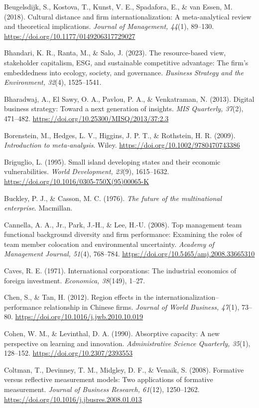 \documentclass[
  a4paper,
  13pt]{extreport}
\begin{document}
Beugelsdijk, S., Kostova, T., Kunst, V. E., Spadafora, E., \& van Essen,
M. (2018). Cultural distance and firm internationalization: A
meta-analytical review and theoretical implications. \emph{Journal of
Management, 44}(1), 89--130.
\url{https://doi.org/10.1177/0149206317729027}

Bhandari, K. R., Ranta, M., \& Salo, J. (2023). The resource-based view,
stakeholder capitalism, ESG, and sustainable competitive advantage: The
firm's embeddedness into ecology, society, and governance.
\emph{Business Strategy and the Environment, 32}(4), 1525--1541.

Bharadwaj, A., El Sawy, O. A., Pavlou, P. A., \& Venkatraman, N. (2013).
Digital business strategy: Toward a next generation of insights.
\emph{MIS Quarterly, 37}(2), 471--482.
\url{https://doi.org/10.25300/MISQ/2013/37:2.3}

Borenstein, M., Hedges, L. V., Higgins, J. P. T., \& Rothstein, H. R.
(2009). \emph{Introduction to meta-analysis}. Wiley.
\url{https://doi.org/10.1002/9780470743386}

Briguglio, L. (1995). Small island developing states and their economic
vulnerabilities. \emph{World Development, 23}(9), 1615--1632.
\url{https://doi.org/10.1016/0305-750X(95)00065-K}

Buckley, P. J., \& Casson, M. C. (1976). \emph{The future of the
multinational enterprise}. Macmillan.

Cannella, A. A., Jr., Park, J.-H., \& Lee, H.-U. (2008). Top management
team functional background diversity and firm performance: Examining the
roles of team member colocation and environmental uncertainty.
\emph{Academy of Management Journal, 51}(4), 768--784.
\url{https://doi.org/10.5465/amj.2008.33665310}

Caves, R. E. (1971). International corporations: The industrial
economics of foreign investment. \emph{Economica, 38}(149), 1--27.

Chen, S., \& Tan, H. (2012). Region effects in the
internationalization--performance relationship in Chinese firms.
\emph{Journal of World Business, 47}(1), 73--80.
\url{https://doi.org/10.1016/j.jwb.2010.10.019}

Cohen, W. M., \& Levinthal, D. A. (1990). Absorptive capacity: A new
perspective on learning and innovation. \emph{Administrative Science
Quarterly, 35}(1), 128--152. \url{https://doi.org/10.2307/2393553}

Coltman, T., Devinney, T. M., Midgley, D. F., \& Venaik, S. (2008).
Formative versus reflective measurement models: Two applications of
formative measurement. \emph{Journal of Business Research, 61}(12),
1250--1262. \url{https://doi.org/10.1016/j.jbusres.2008.01.013}
\end{document}
